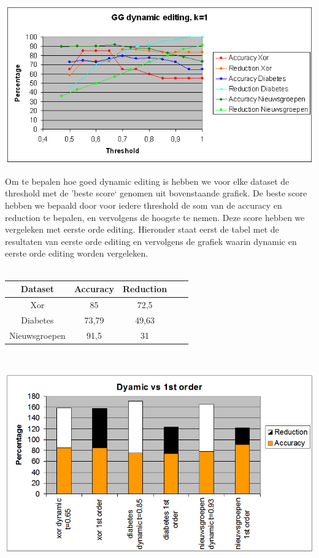 \documentclass{article}
\begin{document}
\begin{center} \includegraphics[scale=0.7]{GG_dynamic} \end{center}

Om te bepalen hoe goed dynamic editing is hebben we voor elke dataset de threshold met de 'beste score` genomen uit bovenstaande grafiek. De beste score hebben we bepaald door voor iedere threshold de som van de accuracy en reduction te bepalen, en vervolgens de hoogste te nemen. Deze score hebben we vergeleken met eerste orde editing. Hieronder staat eerst de tabel met de resultaten van eerste orde editing en vervolgens de grafiek waarin dynamic en eerste orde editing worden vergeleken.\\
\\
\begin{tabular}{|c|c|c|c|c|}  \hline			
Dataset	& Accuracy &	Reduction \\ \hline
Xor	& 85 &	72,5 \\
Diabetes &	73,79 &	49,63 \\
Nieuwsgroepen &	91,5 &	31 \\ \hline
\end{tabular} \\

\begin{center} \includegraphics[scale=0.5]{dynamic_vs_1storder} \end{center}
\end{document}

